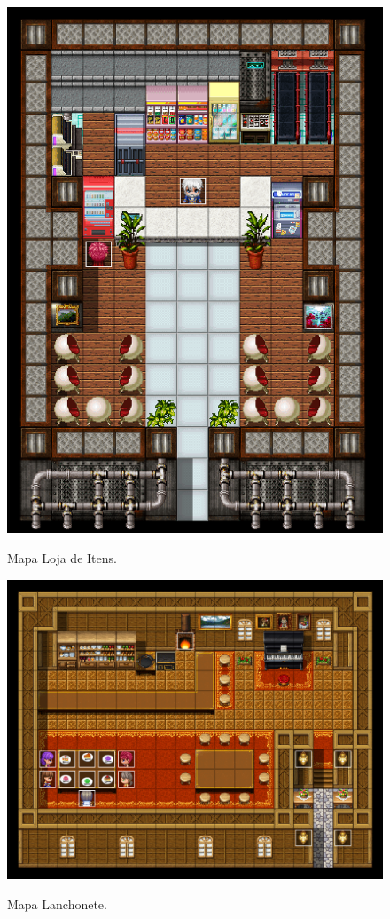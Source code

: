 \begin{figure}[!htbp]
	\centering
	\caption{Mapa Loja de Itens.}
	\includegraphics[scale=0.5]{Textuais/Pictures/Loja_itens.png}
	\label{fig:loja-itens}
\end{figure}

\begin{figure}[!htbp]
	\centering
	\caption{Mapa Lanchonete.}
	\includegraphics[scale=0.5]{Textuais/Pictures/Lanchonete.png}
	\label{fig:lanchonete}
\end{figure}

